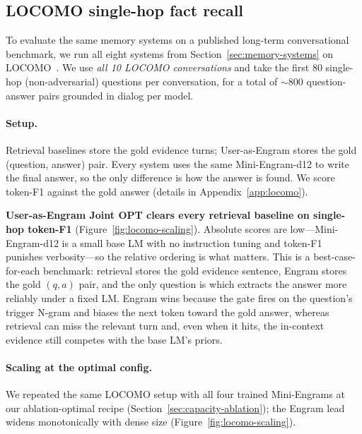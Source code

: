 \documentclass[11pt]{article}
\begin{document}
\subsection{LOCOMO single-hop fact recall}
\label{sec:locomo}

To evaluate the same memory systems on a published long-term
conversational benchmark, we run all eight systems from
Section~\ref{sec:memory-systems} on
LOCOMO~\citep{maharana2024locomo}. We use \emph{all 10 LOCOMO
conversations} and take the first 80 single-hop (non-adversarial)
questions per conversation, for a total of $\sim$800
question-answer pairs grounded in dialog per model.

\paragraph{Setup.} Retrieval baselines store the gold evidence turns;
User-as-Engram stores the gold (question, answer) pair. Every system
uses the same Mini-Engram-d12 to write the final answer, so the only
difference is how the answer is found. We score token-F1 against the
gold answer (details in Appendix~\ref{app:locomo}).


\textbf{User-as-Engram Joint OPT clears every retrieval baseline
on single-hop token-F1} (Figure~\ref{fig:locomo-scaling}).
Absolute scores are low---Mini-Engram-d12 is a small base LM with
no instruction tuning and token-F1 punishes verbosity---so the
relative ordering is what matters. This is a best-case-for-each
benchmark: retrieval stores the gold evidence sentence, Engram
stores the gold $(q, a)$ pair, and the only question is which
extracts the answer more reliably under a fixed LM. Engram wins
because the gate fires on the question's trigger N-gram and
biases the next token toward the gold answer, whereas retrieval
can miss the relevant turn and, even when it hits, the
in-context evidence still competes with the base LM's priors.

\paragraph{Scaling at the optimal config.} We repeated the same
LOCOMO setup with all four trained Mini-Engrams at our
ablation-optimal recipe (Section~\ref{sec:capacity-ablation});
the Engram lead widens monotonically with dense size
(Figure~\ref{fig:locomo-scaling}).
\end{document}
